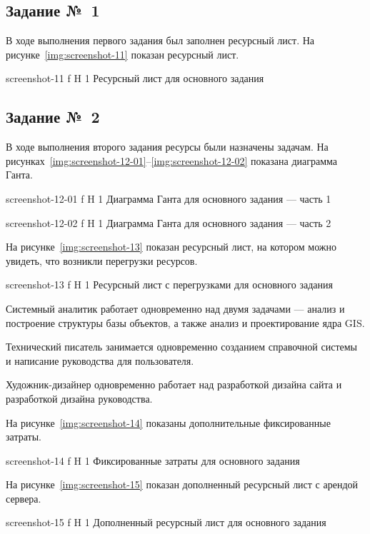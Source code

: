 \documentclass{bmstu}
\begin{document}
\subsection{Задание №~1}

В ходе выполнения первого задания был заполнен ресурсный лист. 
На рисунке~\ref{img:screenshot-11} показан ресурсный лист.
    
    {screenshot-11}
    {f}
    {H}
    {1\textwidth}
    {Ресурсный лист для основного задания}

\subsection{Задание №~2}

В ходе выполнения второго задания ресурсы были назначены задачам. 
На рисунках~\ref{img:screenshot-12-01}--\ref{img:screenshot-12-02} показана диаграмма Ганта.
    
    {screenshot-12-01}
    {f}
    {H}
    {1\textwidth}
    {Диаграмма Ганта для основного задания --- часть 1}
    
    {screenshot-12-02}
    {f}
    {H}
    {1\textwidth}
    {Диаграмма Ганта для основного задания --- часть 2}
    
На рисунке~\ref{img:screenshot-13} показан ресурсный лист, на котором можно увидеть, что возникли перегрузки ресурсов.
    
    {screenshot-13}
    {f}
    {H}
    {1\textwidth}
    {Ресурсный лист с перегрузками для основного задания}
    
Системный аналитик работает одновременно над двумя задачами --- анализ и построение структуры базы объектов, а также анализ и проектирование ядра GIS.

Технический писатель занимается одновременно созданием справочной системы и написание руководства для пользователя.

Художник-дизайнер одновременно работает над разработкой дизайна сайта и разработкой дизайна руководства.

На рисунке~\ref{img:screenshot-14} показаны дополнительные фиксированные затраты.
    
    {screenshot-14}
    {f}
    {H}
    {1\textwidth}
    {Фиксированные затраты для основного задания}
    
На рисунке~\ref{img:screenshot-15} показан дополненный ресурсный лист с арендой сервера.
    
    {screenshot-15}
    {f}
    {H}
    {1\textwidth}
    {Дополненный ресурсный лист для основного задания}
    
\end{document}
